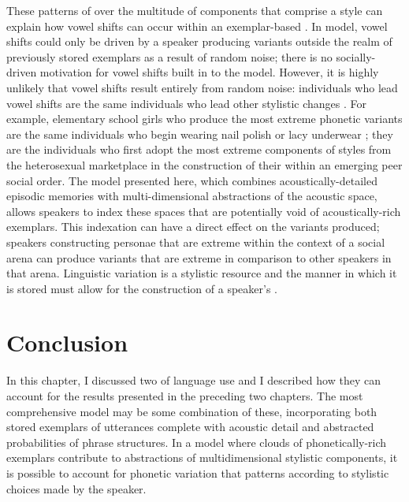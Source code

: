   
These patterns of  over the multitude of components that comprise a style can explain how vowel shifts can occur within an exemplar-based .  In  model, vowel shifts could only be driven by a speaker producing variants outside the realm of previously stored exemplars as a result of random noise; there is no socially-driven motivation for vowel shifts built in to the model.  However, it is highly unlikely that vowel shifts result entirely from random noise: individuals who lead vowel shifts are the same individuals who lead other stylistic changes \citep{labov2001}.  For example, elementary school girls who produce the most extreme phonetic variants are the same individuals who begin wearing nail polish or lacy underwear \citep{eckert1996nailpolish}; they are the individuals who first adopt the most extreme components of styles from the heterosexual marketplace in the construction of their  within an emerging peer social order.  The model presented here, which combines acoustically-detailed episodic memories with multi-dimensional abstractions of the acoustic space, a\-llows speakers to index these spaces that are potentially void of acoustically-rich exemplars.  This indexation can have a direct effect on the variants produced; speakers constructing personae that are extreme within the context of a social arena can produce variants that are extreme in comparison to other speakers in that arena.  Linguistic variation is a stylistic resource and the manner in which it is stored must allow for the construction of a speaker's .


\section{Conclusion}

In this chapter, I discussed two  of language use and I described how they can account for the results presented in the preceding two chapters.  The most comprehensive model may be some combination of these, incorporating both stored exemplars of utterances complete with acoustic detail and abstracted probabilities of phrase structures.  In a model where clouds of phonetically-rich exemplars contribute to abstractions of multidimensional stylistic components, it is possible to account for phonetic variation that patterns according to stylistic choices made by the speaker.  




